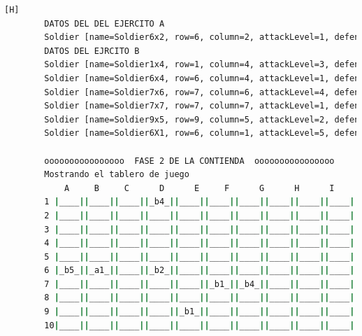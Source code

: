 \documentclass{article}
\begin{document}
\begin{lstlisting}[language=bash,caption={Compilando y probando el programa completo  }][H]
		DATOS DEL DEL EJERCITO A
		Soldier [name=Soldier6x2, row=6, column=2, attackLevel=1, defenseLevel=5, actualLife=1, speed=0, attitude=Repose, current=true]
		DATOS DEL EJRCITO B
		Soldier [name=Soldier1x4, row=1, column=4, attackLevel=3, defenseLevel=3, actualLife=4, speed=0, attitude=Repose, current=true]
		Soldier [name=Soldier6x4, row=6, column=4, attackLevel=1, defenseLevel=4, actualLife=2, speed=0, attitude=Repose, current=true]
		Soldier [name=Soldier7x6, row=7, column=6, attackLevel=4, defenseLevel=2, actualLife=1, speed=0, attitude=Repose, current=true]
		Soldier [name=Soldier7x7, row=7, column=7, attackLevel=1, defenseLevel=4, actualLife=4, speed=0, attitude=Repose, current=true]
		Soldier [name=Soldier9x5, row=9, column=5, attackLevel=2, defenseLevel=5, actualLife=1, speed=0, attitude=Repose, current=true]
		Soldier [name=Soldier6X1, row=6, column=1, attackLevel=5, defenseLevel=5, actualLife=5, speed=0, attitude=Repose, current=true]
		
		oooooooooooooooo  FASE 2 DE LA CONTIENDA  oooooooooooooooo
		Mostrando el tablero de juego
			A     B     C      D      E     F      G      H      I     J 
		1 |____||____||____||_b4_||____||____||____||____||____||____|
		2 |____||____||____||____||____||____||____||____||____||____|
		3 |____||____||____||____||____||____||____||____||____||____|
		4 |____||____||____||____||____||____||____||____||____||____|
		5 |____||____||____||____||____||____||____||____||____||____|
		6 |_b5_||_a1_||____||_b2_||____||____||____||____||____||____|
		7 |____||____||____||____||____||_b1_||_b4_||____||____||____|
		8 |____||____||____||____||____||____||____||____||____||____|
		9 |____||____||____||____||_b1_||____||____||____||____||____|
		10|____||____||____||____||____||____||____||____||____||____|
		

\end{lstlisting}
\end{document}
